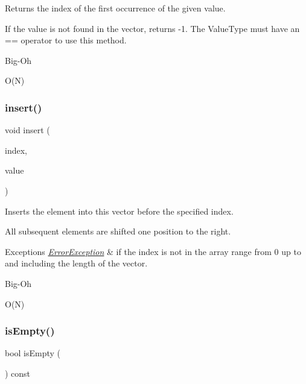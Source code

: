 Returns the index of the first occurrence of the given value. 

If the value is not found in the vector, returns -\/1. The Value\+Type must have an == operator to use this method. \begin{DoxyRefDesc}{Big-\/\+Oh}
\item[\mbox{\hyperlink{BigOh__BigOh000116}{Big-\/\+Oh}}]O(\+N) \end{DoxyRefDesc}
\mbox{\label{classVector_a0b5f5f8e87079d043caa9e5ed00d2941}} 
\subsubsection{\texorpdfstring{insert()}{insert()}}
{\footnotesize\ttfamily void insert (\begin{DoxyParamCaption}\item[{int}]{index,  }\item[{const Value\+Type \&}]{value }\end{DoxyParamCaption})}



Inserts the element into this vector before the specified index. 

All subsequent elements are shifted one position to the right. 
\begin{DoxyExceptions}{Exceptions}
{\em \mbox{\hyperlink{classErrorException}{Error\+Exception}}} & if the index is not in the array range from 0 up to and including the length of the vector. \\
\hline
\end{DoxyExceptions}
\begin{DoxyRefDesc}{Big-\/\+Oh}
\item[\mbox{\hyperlink{BigOh__BigOh000117}{Big-\/\+Oh}}]O(\+N) \end{DoxyRefDesc}
\mbox{\label{classVector_acf82f9b2937375c7b1cf3dccb3df3312}} 
\subsubsection{\texorpdfstring{is\+Empty()}{isEmpty()}}
{\footnotesize\ttfamily bool is\+Empty (\begin{DoxyParamCaption}{ }\end{DoxyParamCaption}) const}




